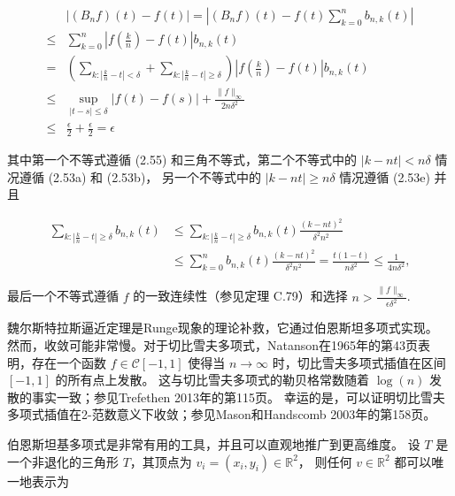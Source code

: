 \documentclass[a4paper]{ctexart}
\begin{document}
{\begin{align*}
& \left| \left( B_n f \right)(t) - f(t) \right| = \left| \left( B_n f \right)(t) - f(t) \sum_{k=0}^n b_{n, k}(t) \right| \\
\leq & \sum_{k=0}^n \left| f\left( \frac{k}{n} \right) - f(t) \right| b_{n, k}(t) \\
= & \left( \sum_{k: \left| \frac{k}{n} - t \right| < \delta} + \sum_{k: \left| \frac{k}{n} - t \right| \geq \delta} \right) \left| f\left( \frac{k}{n} \right) - f(t) \right| b_{n, k}(t) \\
\leq & \sup_{|t-s| \leq \delta} \left| f(t) - f(s) \right| + \frac{\| f \|_{\infty}}{2 n \delta^2} \\
\leq & \frac{\epsilon}{2} + \frac{\epsilon}{2} = \epsilon
\end{align*}

其中第一个不等式遵循 (2.55) 和三角不等式，第二个不等式中的 \( |k - n t| < n \delta \) 情况遵循 (2.53a) 和 (2.53b)，
另一个不等式中的 \( |k - n t| \geq n \delta \) 情况遵循 (2.53e) 并且

\begin{align*}
\sum_{k: \left| \frac{k}{n} - t \right| \geq \delta} b_{n, k}(t) 
& \leq \sum_{k: \left| \frac{k}{n} - t \right| \geq \delta} b_{n, k}(t) \frac{(k - n t)^{2}}{\delta^{2} n^{2}} \\
& \leq \sum_{k=0}^{n} b_{n, k}(t) \frac{(k - n t)^{2}}{\delta^{2} n^{2}} = \frac{t(1-t)}{n \delta^{2}} \leq \frac{1}{4 n \delta^{2}},
\end{align*}

最后一个不等式遵循 \(f\) 的一致连续性（参见定理 C.79）和选择 \( n > \frac{\| f \|_{\infty}}{\epsilon \delta^{2}} \).

 魏尔斯特拉斯逼近定理是Runge现象的理论补救，它通过伯恩斯坦多项式实现。
然而，收敛可能非常慢。对于切比雪夫多项式，Natanson在1965年的第43页表明，存在一个函数 \( f \in \mathcal{C}[-1,1] \) 
使得当 \( n \rightarrow \infty \) 时，切比雪夫多项式插值在区间 \([-1,1]\) 的所有点上发散。
这与切比雪夫多项式的勒贝格常数随着 \( \log(n) \) 发散的事实一致；参见Trefethen 2013年的第115页。
幸运的是，可以证明切比雪夫多项式插值在2-范数意义下收敛；参见Mason和Handscomb 2003年的第158页。

 伯恩斯坦基多项式是非常有用的工具，并且可以直观地推广到更高维度。
设 \( T \) 是一个非退化的三角形 \( T \)，其顶点为 \( v_{i} = \left(x_{i}, y_{i}\right) \in \mathbb{R}^{2} \)，
则任何 \( v \in \mathbb{R}^{2} \) 都可以唯一地表示为

}
\end{document}
